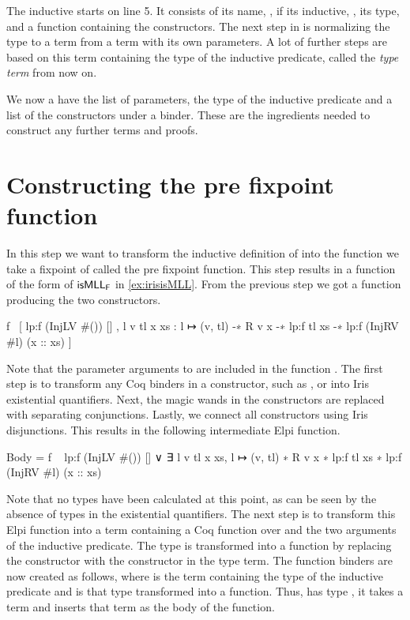 \documentclass[thesis.tex]{subfiles}
\begin{document}
The inductive starts on line 5. It consists of its name, , if its inductive, , its type, and a function containing the constructors.
The next step in  is normalizing the type to a term from a term with its own parameters. A lot of further steps are based on this term containing the type of the inductive predicate, called the \emph{type term} from now on.

We now a have the list of parameters, the type of the inductive predicate and a list of the constructors under a binder. These are the ingredients needed to construct any further terms and proofs.

\section{Constructing the pre fixpoint function}\label{sec:pff}
In this step we want to transform the inductive definition of  into the function we take a fixpoint of called the pre fixpoint function. This step results in a function of the form of $\textsf{\upshape isMLL}_{\textsf{\upshape F}}$ in \cref{ex:irisisMLL}.
From the previous step we got a function producing the two constructors.
\begin{elpicode}
  f \ [
    {{ lp:f (InjLV #()) [] }},
    {{ l v tl x xs : l ↦ (v, tl) -∗ R v x -∗ lp:f tl xs 
                     -∗ lp:f (InjRV #l) (x :: xs) }}
  ]
\end{elpicode}
Note that the parameter arguments to  are included in the function . The first step is to transform any Coq binders in a constructor, such as ,  or  into Iris existential quantifiers. Next, the magic wands in the constructors are replaced with separating conjunctions. Lastly, we connect all constructors using Iris disjunctions. This results in the following intermediate Elpi function.
\begin{elpicode}
  Body = f \ {{
      lp:f (InjLV #()) []
    ∨ ∃ l v tl x xs, 
        l ↦ (v, tl) ∗ R v x ∗ lp:f tl xs ∗ 
        lp:f (InjRV #l) (x :: xs)
  }}
\end{elpicode}
Note that no types have been calculated at this point, as can be seen by the absence of types in the existential quantifiers.
The next step is to transform this Elpi function into a term containing a Coq function over  and the two arguments of the inductive predicate. The type is transformed into a function by replacing the  constructor with the  constructor in the type term. The function binders are now created as follows, where  is the term containing the type of the inductive predicate and  is that type transformed into a function. Thus,  has type , it takes a term and inserts that term as the body of the function.
\end{document}

